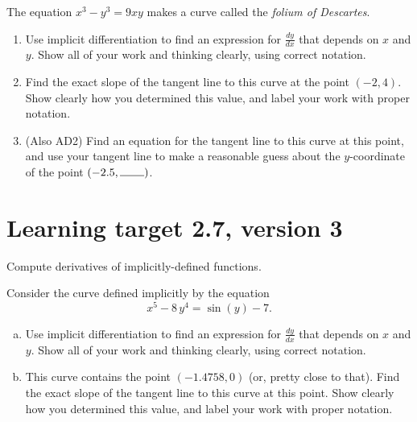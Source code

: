 The equation \(x^{3}-y^{3}=9xy\) makes a curve called the \textit{folium of Descartes}.

\begin{enumerate}
	\item Use implicit differentiation to find an expression for $\frac{dy}{dx}$ that depends on $x$ and $y$.  Show all of your work and thinking clearly, using correct notation.

	\vfill

	\item Find the exact slope of the tangent line to this curve at the point \((-2, 4)\). Show clearly how you determined this value, and label your work with proper notation.

	\vfill

	\item (Also AD2) Find an equation for the tangent line to this curve at this point, and use your tangent line to make a reasonable guess about the $y$-coordinate of the point $(-2.5, \rule{0.75cm}{0.15mm} )$.
	\vspace{1in}
\end{enumerate}

\pagebreak

\section{Learning target 2.7, version 3}

Compute derivatives of implicitly-defined functions.

\hrulefill

Consider the curve defined implicitly by the equation
\[x^5 - 8\, y^4 = \sin\left(y\right) - 7.\]

\begin{enumerate}[(a)]
	\item Use implicit differentiation to find an expression for $\frac{dy}{dx}$ that depends on $x$ and $y$.  Show all of your work and thinking clearly, using correct notation.

	\vfill

	\item This curve contains the point \((-1.4758, 0)\) (or, pretty close to that). Find the exact slope of the tangent line to this curve at this point. Show clearly how you determined this value, and label your work with proper notation.

	\vfill
\end{enumerate}

